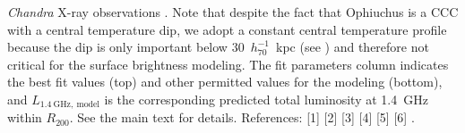 \documentclass[traditabstract]{aa}
\newcommand{\rmn}{\mathrm}
\begin{document}
\begin{table}[t]
{  {\em Chandra} X-ray observations \citep{2005ApJ...628..655V}. Note that
  despite the fact that Ophiuchus is a CCC with a central temperature dip, we
  adopt a constant central temperature profile because the dip is only important
  below $30$~$h_{70}^{-1}$~kpc (see \citealp{2010MNRAS.405.1624M}) and therefore
  not critical for the surface brightness modeling. The fit parameters
  column indicates the best fit values (top) and other permitted values for the
  modeling (bottom), and $L_{1.4~\rmn{GHz},~\rmn{model}}$ is the corresponding
  predicted total luminosity at 1.4~GHz within $R_{200}$. See the main text for
  details. References: [1] \cite{1997A&A...321...55D} [2]
  \cite{1992A&A...259L..31B} [3] \cite{2002ApJ...567..716R} [4]
  \cite{2009A&A...499..679M} [5] \cite{1990MNRAS.246..477P} [6]
  \cite{2003ApJ...590..225C}.}
\end{table}
\end{document}
